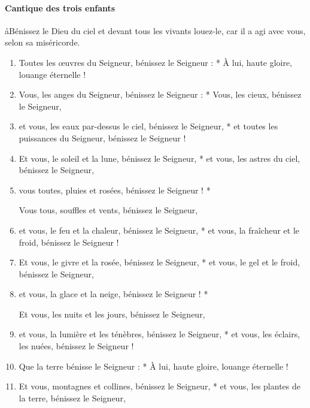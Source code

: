 \documentclass[twoside]{article}
\begin{document}
\begin{paracol}[1]{2}
\switchcolumn

\paragraph{Cantique des trois enfants}

\aa Bénissez le Dieu du ciel et devant tous les vivants louez-le, car il a agi avec vous, selon sa miséricorde.


\begin{enumerate}[wide, itemsep=0mm, labelwidth=!, labelindent=0pt, label=\color{gregoriocolor}\theenumi]
\item Toutes les œuvres du Seigneur,
   bénissez le Seigneur : *
À lui, haute gloire, louange éternelle !

\item Vous, les anges du Seigneur,
   bénissez le Seigneur : *
 Vous, les cieux,
   bénissez le Seigneur,
   
\item et vous, les eaux par-dessus le ciel,
   bénissez le Seigneur, *
    et toutes les puissances du Seigneur,
   bénissez le Seigneur !

\item Et vous, le soleil et la lune,
   bénissez le Seigneur, *
et vous, les astres du ciel, 
   bénissez le Seigneur,
\item vous toutes, pluies et rosées,
   bénissez le Seigneur ! *

 Vous tous, souffles et vents,
   bénissez le Seigneur,
\item et vous, le feu et la chaleur,
   bénissez le Seigneur, *
et vous, la fraîcheur et le froid,
   bénissez le Seigneur !

\item Et vous, le givre et la rosée,
   bénissez le Seigneur, *
et vous, le gel et le froid,
   bénissez le Seigneur,
\item et vous, la glace et la neige,
   bénissez le Seigneur ! *

Et vous, les nuits et les jours,
   bénissez le Seigneur,
\item et vous, la lumière et les ténèbres,
   bénissez le Seigneur, *
et vous, les éclairs, les nuées,
   bénissez le Seigneur !

\item Que la terre bénisse le Seigneur : *
À lui, haute gloire, louange éternelle !

\item Et vous, montagnes et collines,
   bénissez le Seigneur, *
et vous, les plantes de la terre,
   bénissez le Seigneur,
   

\end{enumerate}
\end{paracol}
\end{document}
